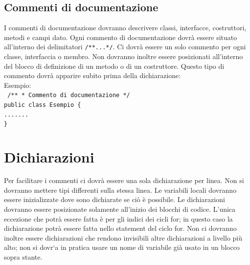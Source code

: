 \documentclass[11pt,titlepage,a4paper]{report}
\begin{document}
\subsection{Commenti di documentazione}
I commenti di documentazione dovranno descrivere classi, interfacce, costruttori, metodi e campi dato. Ogni commento di documentazione dovr\`a essere situato all'interno dei delimitatori \texttt{/**...*/}. Ci dovr\`a essere un solo commento per ogni classe, interfaccia o membro. Non dovranno inoltre essere posizionati all'interno del blocco di definizione di un metodo o di un costruttore. Questo tipo di commento dovr\`a apparire subito prima della dichiarazione:\\
 \newline
Esempio:\\
 \newline
\texttt{
	/** \newline
	* Commento di documentazione \newline
	*/ \\
	public class Esempio \{ \\
	\phantom{....}....... \\
	\}
	\\
}
 \newline
\section{Dichiarazioni}
Per facilitare i commenti ci dovr\`a essere una sola dichiarazione per linea. Non si dovranno mettere tipi differenti sulla stessa linea. Le variabili locali dovranno essere inizializzate dove sono dichiarate se ci\`o \`e possibile. Le dichiarazioni dovranno essere posizionate solamente all'inizio dei blocchi di codice. L'unica eccezione che potr\`a essere fatta è per gli indici dei cicli for; in questo caso la dichiarazione potr\`a essere fatta nello statement del ciclo for. Non ci dovranno inoltre essere dichiarazioni che rendono invisibili altre dichiarazioni a livello più alto; non si dovr`a in pratica usare un nome di variabile già usato in un blocco sopra stante.
\end{document}
